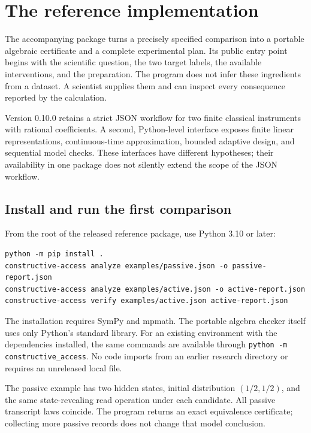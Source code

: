 \chapter{The reference implementation}
\label{toolkit:chapter}

The accompanying package turns a precisely specified comparison into a
portable algebraic certificate and a complete experimental plan. Its public
entry point begins with the scientific question, the two target labels, the
available interventions, and the preparation. The program does not infer
these ingredients from a dataset. A scientist supplies them and can inspect
every consequence reported by the calculation.

Version 0.10.0 retains a strict JSON workflow for two finite classical
instruments with rational coefficients. A second, Python-level interface
exposes finite linear representations, continuous-time approximation,
bounded adaptive design, and sequential model checks. These interfaces have
different hypotheses; their availability in one package does not silently
extend the scope of the JSON workflow.

\section{Install and run the first comparison}

From the root of the released reference package, use Python 3.10 or later:
\begin{verbatim}
python -m pip install .
constructive-access analyze examples/passive.json -o passive-report.json
constructive-access analyze examples/active.json -o active-report.json
constructive-access verify examples/active.json active-report.json
\end{verbatim}
The installation requires SymPy and mpmath. The portable algebra checker itself uses
only Python's standard library. For an existing environment with the
dependencies installed, the same commands are available through
\texttt{python -m constructive\_access}. No code imports from an earlier
research directory or requires an unreleased local file.

The passive example has two hidden states, initial distribution
$(1/2,1/2)$, and the same state-revealing read operation under each candidate.
All passive transcript laws coincide. The program returns an exact
equivalence certificate; collecting more passive records does not change
that model conclusion.

